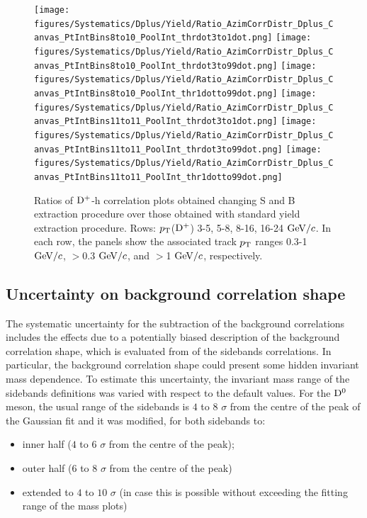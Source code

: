 \begin{figure}
{\texttt{[image: figures/Systematics/Dplus/Yield/Ratio\_AzimCorrDistr\_Dplus\_Canvas\_PtIntBins8to10\_PoolInt\_thrdot3to1dot.png]}}
{\texttt{[image: figures/Systematics/Dplus/Yield/Ratio\_AzimCorrDistr\_Dplus\_Canvas\_PtIntBins8to10\_PoolInt\_thrdot3to99dot.png]}}
{\texttt{[image: figures/Systematics/Dplus/Yield/Ratio\_AzimCorrDistr\_Dplus\_Canvas\_PtIntBins8to10\_PoolInt\_thr1dotto99dot.png]}}
{\texttt{[image: figures/Systematics/Dplus/Yield/Ratio\_AzimCorrDistr\_Dplus\_Canvas\_PtIntBins11to11\_PoolInt\_thrdot3to1dot.png]}}
{\texttt{[image: figures/Systematics/Dplus/Yield/Ratio\_AzimCorrDistr\_Dplus\_Canvas\_PtIntBins11to11\_PoolInt\_thrdot3to99dot.png]}}
{\texttt{[image: figures/Systematics/Dplus/Yield/Ratio\_AzimCorrDistr\_Dplus\_Canvas\_PtIntBins11to11\_PoolInt\_thr1dotto99dot.png]}}
\caption{Ratios of ${\rm D^+}$-h correlation plots obtained changing S and B extraction procedure over those obtained with standard yield extraction procedure. Rows: $p_{\rm T}$(${\rm D^+}$) 3-5, 5-8, 8-16, 16-24 $\mathrm{GeV}/c$. In each row, the panels show the associated track $p_{\rm T}$ ranges 0.3-1 $\mathrm{GeV}/c$, $>$0.3 $\mathrm{GeV}/c$, and $>$1 $\mathrm{GeV}/c$, respectively.}
\label{fig:Syst_DplusYield}
\end{figure}




\subsection{Uncertainty on background correlation shape}
The systematic uncertainty for the subtraction of the background correlations includes the effects due to a potentially biased description of the background correlation shape, which is evaluated from of the sidebands correlations. In particular, the background correlation shape could present some hidden invariant mass dependence. To estimate this uncertainty, the invariant mass range of the sidebands definitions was varied with respect to the default values. For the ${\rm D^0}$ meson, the usual range of the sidebands is $4$ to $8$ $\sigma$ from the centre of the peak of the Gaussian fit and it was modified, for both sidebands to:
\begin{itemize}
    \item inner half ($4$ to $6$ $\sigma$ from the centre of the peak);
    \item outer half ($6$ to $8$ $\sigma$ from the centre of the peak)
    \item extended to $4$ to $10$ $\sigma$ (in case this is possible without exceeding the fitting range of the mass plots)
\end{itemize}


